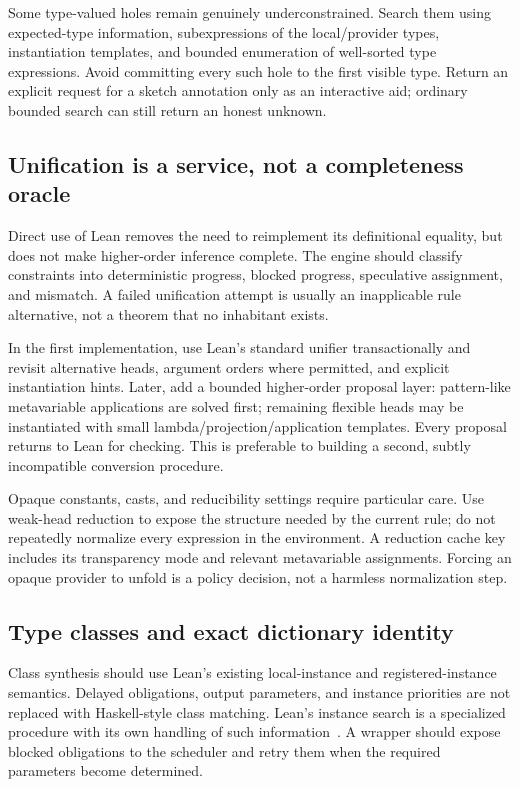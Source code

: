 Some type-valued holes remain genuinely underconstrained. Search them using
expected-type information, subexpressions of the local/provider types,
instantiation templates, and bounded enumeration of well-sorted type
expressions. Avoid committing every such hole to the first visible type.
Return an explicit request for a sketch annotation only as an interactive aid;
ordinary bounded search can still return an honest unknown.

\subsection{Unification is a service, not a completeness oracle}

Direct use of Lean removes the need to reimplement its definitional equality,
but does not make higher-order inference complete. The engine should classify
constraints into deterministic progress, blocked progress, speculative
assignment, and mismatch. A failed unification attempt is usually an
inapplicable rule alternative, not a theorem that no inhabitant exists.

In the first implementation, use Lean's standard unifier transactionally and
revisit alternative heads, argument orders where permitted, and explicit
instantiation hints. Later, add a bounded higher-order proposal layer:
pattern-like metavariable applications are solved first; remaining flexible
heads may be instantiated with small lambda/projection/application templates.
Every proposal returns to Lean for checking. This is preferable to building a
second, subtly incompatible conversion procedure.

Opaque constants, casts, and reducibility settings require particular care.
Use weak-head reduction to expose the structure needed by the current rule;
do not repeatedly normalize every expression in the environment. A reduction
cache key includes its transparency mode and relevant metavariable assignments.
Forcing an opaque provider to unfold is a policy decision, not a harmless
normalization step.

\subsection{Type classes and exact dictionary identity}

Class synthesis should use Lean's existing local-instance and registered-instance
semantics. Delayed obligations, output parameters, and instance priorities are
not replaced with Haskell-style class matching. Lean's instance search is a
specialized procedure with its own handling of such information~\cite{lean-instances}.
A wrapper should expose blocked obligations to the scheduler and retry them
when the required parameters become determined.

